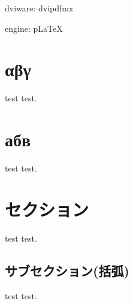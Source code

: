 \documentclass[autodetect-engine]{jsarticle}
\newif\ifuptexmode
\begin{document}
\parindent0mm

dviware: dvipdfmx

\ifuptexmode
engine: upLaTeX
\typeout{### engine: upLaTeX ###}
\else
engine: pLaTeX
\fi

\section{αβγ}
test test.

\section{абв}
test test.

\section{セクション}
test test.
\subsection{サブセクション(括弧)}
test test.

\ifuptexmode

\section{以下は、upLaTeXのみ}
\subsection{いわゆる『JIS2004』: ♡〠☎☃♨①❷ⅳⅤⓐ㋑}
便利な記号がいっぱい。

\subsection{Extension B (BMP外)の文字: 𠘨𤴔𦥑𧾷𩙿など}
𠘨𤴔𦥑𧾷𩙿

\fi
\end{document}
